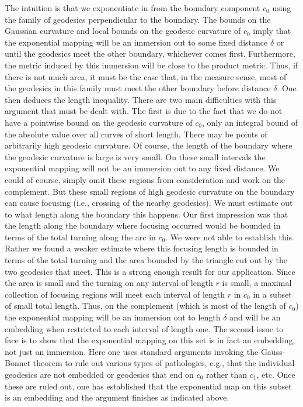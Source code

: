 The intuition is that we exponentiate in from the boundary component
$c_0$ using the family of geodesics perpendicular to the boundary.
The bounds on the Gaussian curvature and local bounds on the
geodesic curvature of $c_0$ imply that the exponential mapping will
be an immersion out to some fixed distance $\delta$ or until the
geodesics  meet the other boundary, whichever comes first.
Furthermore, the metric induced by  this immersion will be close to
the product metric. Thus, if there is not much area, it must be the
case that, in the measure sense, most of the geodesics in this
family must meet the other boundary before distance $\delta$. One
then deduces the length inequality. There are two main difficulties
with this argument that must be dealt with. The first is due to the
fact that we do not have a pointwise bound on the geodesic curvature
of $c_0$, only an integral bound of the absolute value over all
curves of short length. There may be points of arbitrarily high
geodesic curvature. Of course, the length of the boundary where the
geodesic curvature is large is very small. On these small intervals
the exponential mapping will not be an immersion out to any fixed
distance. We could of course, simply omit these regions from
consideration and work on the complement. But these small regions of
high geodesic curvature on the boundary can cause focusing (i.e.,
crossing of the nearby geodesics). We must estimate out to what
length along the boundary this happens. Our first impression was
that the length along the boundary where focusing occurred would be
bounded in terms of the total turning along the arc in $c_0$. We
were not able to establish this. Rather we found a weaker estimate
where this focusing length is bounded in terms of the total turning
 and the area bounded by the triangle cut out by the two geodesics
that meet. This is a strong enough result for our application. Since
the area is small and the turning on any interval of length $r$ is
small, a maximal collection of focusing regions will meet each
interval of length $r$ in $c_0$ in a subset of small total length.
Thus, on the complement (which is most of the length of $c_0$) the
exponential mapping will be an immersion out to length $\delta$ and
will be an embedding when restricted to each interval of length one.
The second issue to face is to show that the exponential mapping on
this set is in fact an embedding, not just an immersion. Here one
uses standard arguments invoking the Gauss-Bonnet theorem to rule
out various types of pathologies, e.g., that the individual
geodesics are not embedded or geodesics that end on $c_0$ rather
than $c_1$, etc. Once these are ruled out, one has established that
the exponential map on this subset is an embedding and the argument
finishes as indicated above.


